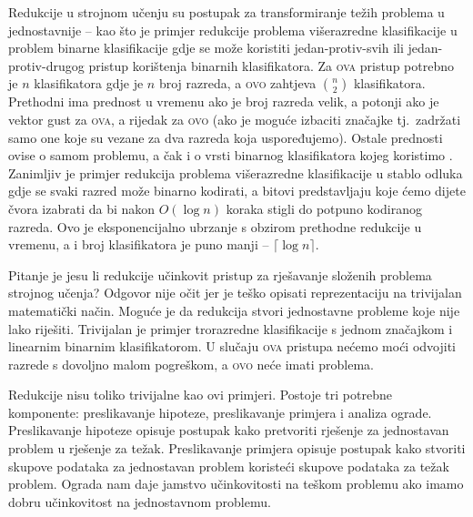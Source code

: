Redukcije u strojnom učenju su postupak za transformiranje težih problema u
jednostavnije -- kao što je primjer redukcije problema višerazredne
klasifikacije u problem binarne klasifikacije gdje se može koristiti
jedan-protiv-svih  ili jedan-protiv-drugog
 pristup korištenja binarnih klasifikatora. Za
\textsc{ova} pristup potrebno je $n$ klasifikatora gdje je $n$ broj razreda, a
\textsc{ovo} zahtjeva $\binom{n}{2}$ klasifikatora. Prethodni ima prednost u
vremenu ako je broj razreda velik, a potonji ako je vektor gust za \textsc{ova},
a rijedak za \textsc{ovo} (ako je moguće izbaciti značajke tj.~zadržati samo one
koje su vezane za dva razreda koja uspoređujemo). Ostale prednosti ovise o samom
problemu, a čak i o vrsti binarnog klasifikatora kojeg koristimo
\citep{milgram2006one}. Zanimljiv je primjer redukcija problema višerazredne
klasifikacije u stablo odluka  gdje se svaki razred može
binarno kodirati, a bitovi predstavljaju koje ćemo dijete čvora izabrati da bi
nakon $O(\log n)$ koraka stigli do potpuno kodiranog razreda. Ovo je
eksponencijalno ubrzanje s obzirom prethodne redukcije u vremenu, a i broj
klasifikatora je puno manji -- $\lceil \log n \rceil$.

Pitanje je jesu li redukcije učinkovit pristup za rješavanje složenih problema
strojnog učenja? Odgovor nije očit jer je teško opisati reprezentaciju na
trivijalan matematički način. Moguće je da redukcija stvori jednostavne probleme
koje nije lako riješiti. Trivijalan je primjer trorazredne klasifikacije s
jednom značajkom i linearnim binarnim klasifikatorom. U slučaju \textsc{ova}
pristupa nećemo moći odvojiti razrede s dovoljno malom pogreškom, a \textsc{ovo}
neće imati problema.

Redukcije nisu toliko trivijalne kao ovi primjeri. Postoje tri potrebne
komponente: preslikavanje hipoteze, preslikavanje primjera i analiza ograde.
Preslikavanje hipoteze opisuje postupak kako pretvoriti rješenje za jednostavan
problem u rješenje za težak. Preslikavanje primjera opisuje postupak kako
stvoriti skupove podataka za jednostavan problem koristeći skupove podataka za
težak problem. Ograda nam daje jamstvo učinkovitosti na teškom problemu ako
imamo dobru učinkovitost na jednostavnom problemu.

